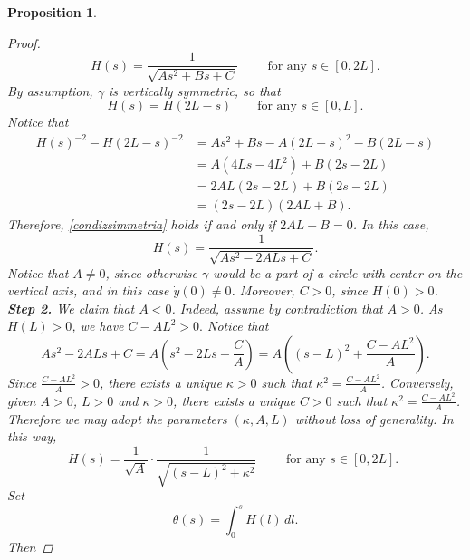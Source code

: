 \documentclass[11pt]{amsart}
\renewcommand{\k}{\kappa}
\newtheorem{proposition}[theorem]{Proposition}
\theoremstyle{definition}
\theoremstyle{remark}
\numberwithin{equation}{section}
\begin{document}
\begin{proposition}
\begin{proof}
			\begin{equation*}
				H(s)=\frac{1}{\sqrt{As^2+Bs+C}}\qquad\text{ for any $s\in [0,2L]$.}
			\end{equation*}  
			By assumption, $\gamma$ is vertically symmetric, so that     \begin{equation}\label{condizsimmetria}
				H(s)=H(2L-s)\qquad \text{for any $s\in[0,L]$}.
			\end{equation}   
			Notice that
			\begin{equation*}
				\begin{split}
					H(s)^{-2}-H(2L-s)^{-2}&=As^2+Bs-A(2L-s)^2-B(2L-s)\\
					&=A(4Ls-4L^2)+B(2s-2L)\\
					&=2AL(2s-2L)+B(2s-2L)\\
					&=(2s-2L)(2AL+B).
				\end{split}
			\end{equation*}
			Therefore, \eqref{condizsimmetria} holds if and only if $2AL+B=0$. In this case,
			\begin{equation*}
				H(s)=\frac{1}{\sqrt{As^2-2ALs+C}}.
			\end{equation*}
			Notice that $A\neq 0$,
			since otherwise $\gamma$ would be a part of a circle with center on the vertical axis, and in this case $\dot y(0)\neq 0$. Moreover, $C>0$, since $H(0)>0$.\\
			\textbf{Step 2.}
			We claim that $A<0$. Indeed, assume by contradiction that $A>0$. As $H(L)>0$, we have $        C-AL^2>0.$
			Notice that
			\begin{equation*}
				As^2-2ALs+C=A\left(s^2-2Ls+\frac{C}{A}\right)=A\left((s-L)^2+\frac{C-AL^2}{A}\right).
			\end{equation*}
			Since $\frac{C-AL^2}{A}>0$, there exists a unique $\k>0$ such that $\k^2=\frac{C-AL^2}{A}$. Conversely, given $A>0$, $L>0$ and $\k>0$, there exists a unique $C>0$ such that $\k^2=\frac{C-AL^2}{A}$. Therefore we may adopt the parameters $(\k,A,L)$ without loss of generality. In this way, 
			\begin{equation*}
				H(s)=\frac{1}{\sqrt{A}}\cdot\frac{1}{\sqrt{(s-L)^2+\k^2}}\qquad\text{  for any $s\in[0,2L]$. }
			\end{equation*}
			Set $$\theta(s)=\int_0^s H(l)\,dl.$$ Then 

\end{proof}
\end{proposition}
\end{document}
